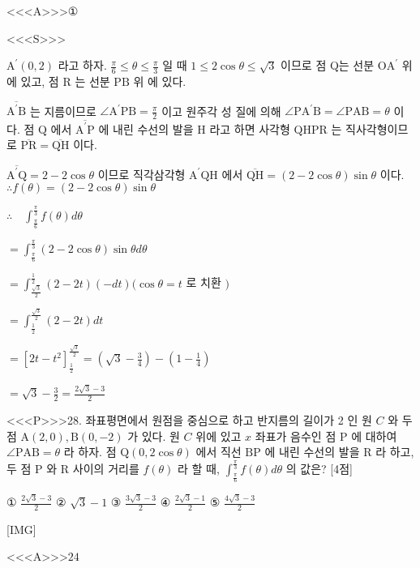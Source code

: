 \documentclass{oblivoir}
\begin{document}
<<<A>>>①

<<<S>>>



$\mathrm{A}^{\prime}(0,2)$ 라고 하자. $\frac{\pi}{6} \leq \theta \leq \frac{\pi}{3}$ 일 때 $1 \leq 2 \cos \theta \leq \sqrt{3}$ 이므로 점 Q는 선분 $\mathrm{OA}^{\prime}$ 위에 있고, 점 $\mathrm{R}$ 는 선분 $\mathrm{PB}$ 위 에 있다.

$\overline{\mathrm{A}^{\prime} \mathrm{B}}$ 는 지름이므로 $\angle \mathrm{A}^{\prime} \mathrm{PB}=\frac{\pi}{2}$ 이고 원주각 성 질에 의해 $\angle \mathrm{PA}^{\prime} \mathrm{B}=\angle \mathrm{P} \mathrm{AB}=\theta$ 이다.
점 $\mathrm{Q}$ 에서 $\overline{\mathrm{A}^{\prime} \mathrm{P}}$ 에 내린 수선의 발을 $\mathrm{H}$ 라고 하면 사각형 $\mathrm{QHPR}$ 는 직사각형이므로 $\overline{\mathrm{PR}}=\overline{\mathrm{QH}}$ 이다.

$\overline{\mathrm{A}^{\prime} \mathrm{Q}}=2-2 \cos \theta$ 이므로
직각삼각형 $\mathrm{A}^{\prime} \mathrm{QH}$ 에서
$\overline{\mathrm{QH}}=(2-2 \cos \theta) \sin \theta$ 이다.
$\therefore f(\theta)=(2-2 \cos \theta) \sin \theta$

$\therefore \quad \int_{\frac{\pi}{6}}^{\frac{\pi}{3}} f(\theta) d \theta$

$=\int_{\frac{\pi}{6}}^{\frac{\pi}{3}}(2-2 \cos \theta) \sin \theta d \theta$

$=\int_{\frac{\sqrt{3}}{2}}^{\frac{1}{2}}(2-2 t)(-d t)(\cos \theta=t$ 로 치환 $)$

$=\int_{\frac{1}{2}}^{\frac{\sqrt{3}}{2}}(2-2 t) d t$

$=\left[2 t-t^{2}\right]_{\frac{1}{2}}^{\frac{\sqrt{3}}{2}}=\left(\sqrt{3}-\frac{3}{4}\right)-\left(1-\frac{1}{4}\right)$

$=\sqrt{3}-\frac{3}{2}=\frac{2 \sqrt{3}-3}{2}$


<<<P>>>28. 좌표평면에서 원점을 중심으로 하고 반지름의 길이가 2 인 원 $C$ 와 두 점 $\mathrm{A}(2,0), \mathrm{B}(0,-2)$ 가 있다. 원 $C$ 위에 있고 $x$ 좌표가 음수인 점 $\mathrm{P}$ 에 대하여 $\angle \mathrm{PAB}=\theta$ 라 하자.
점 $\mathrm{Q}(0,2 \cos \theta)$ 에서 직선 $\mathrm{BP}$ 에 내린 수선의 발을 $\mathrm{R}$ 라 하고, 두 점 $\mathrm{P}$ 와 $\mathrm{R}$ 사이의 거리를 $f(\theta)$ 라 할 때, $\int_{\frac{\pi}{6}}^{\frac{\pi}{3}} f(\theta) d \theta$ 의 값은? [4점]

① $\frac{2 \sqrt{3}-3}{2}$
② $\sqrt{3}-1$
③ $\frac{3 \sqrt{3}-3}{2}$
④ $\frac{2 \sqrt{3}-1}{2}$
⑤ $\frac{4 \sqrt{3}-3}{2}$


[IMG]


<<<A>>>$24$
\end{document}
